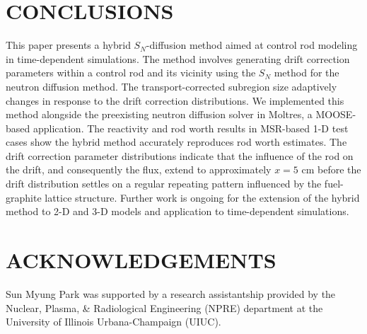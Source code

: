 \documentclass[letterpaper]{mc2025}
\begin{document}
\section{CONCLUSIONS}

This paper presents a hybrid $S_N$-diffusion method aimed at control rod modeling in time-dependent
simulations. The method involves generating drift correction parameters within a control rod and
its vicinity using the $S_N$ method for the neutron diffusion method. The transport-corrected
subregion size adaptively changes in response to the drift correction distributions. We implemented
this method alongside the preexisting neutron diffusion solver in Moltres, a \gls*{MOOSE}-based
application. The reactivity and rod worth results in \gls*{MSR}-based 1-D test cases show the hybrid
method accurately reproduces rod worth estimates. The drift correction parameter
distributions indicate that the influence of the rod on the drift, and
consequently the flux, extend to approximately $x=5$ cm before the drift distribution settles on a
regular repeating pattern influenced by the fuel-graphite lattice structure. Further work is
ongoing for the extension of the hybrid method to 2-D and 3-D models and application to
time-dependent simulations.

\section*{ACKNOWLEDGEMENTS}
Sun Myung Park was supported by a research assistantship provided by the Nuclear, Plasma, \&
Radiological Engineering (NPRE) department at the University of Illinois Urbana-Champaign (UIUC).



\end{document}
